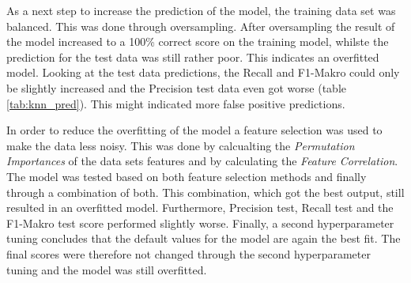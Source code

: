 As a next step to increase the prediction of the model, the training data set was balanced. This was done through oversampling. After oversampling the result of the model increased to a 100\% correct score on the training model, whilste the prediction for the test data was still rather poor. This indicates an overfitted model. Looking at the test data predictions, the Recall and F1-Makro could only be slightly increased and the Precision test data even got worse (table \ref{tab:knn_pred}). This might indicated more false positive predictions. 


In order to reduce the overfitting of the model a feature selection was used to make the data less noisy. This was done by calcualting the \textit{Permutation Importances} of the data sets features and by calculating the \textit{Feature Correlation}. The model was tested based on both feature selection methods and finally through a combination of both. This combination, which got the best output, still resulted in an overfitted model. Furthermore, Precision test, Recall test and the F1-Makro test score performed slightly worse. %
Finally, a second hyperparameter tuning concludes that the default values for the model are again the best fit. The final scores were therefore not changed through the second hyperparameter tuning and the model was still overfitted. %


